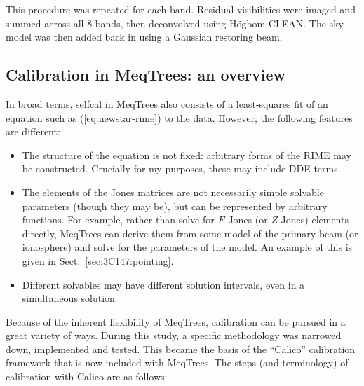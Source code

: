 \documentclass[]{aa}
\begin{document}
This procedure was repeated for each band. Residual visibilities were imaged and summed across all 8 bands, then  deconvolved using H\"ogbom CLEAN. The sky model was then added back in using a Gaussian restoring beam.

\subsection{Calibration in MeqTrees: an overview}

In broad terms, selfcal in MeqTrees also consists of a least-squares fit of an equation such as (\ref{eq:newstar-rime}) to the data. However, the following features are different:

\begin{itemize}
\item The structure of the equation is not fixed: arbitrary forms of the RIME may be constructed. Crucially for my purposes, these may include DDE terms.
\item The elements of the Jones matrices are not necessarily simple solvable parameters (though they may be), but can be represented by arbitrary functions. For example, rather than solve for $E$-Jones (or $Z$-Jones) elements directly, MeqTrees can derive them from some model of the primary beam (or ionosphere) and solve for the parameters of the model. An example of this is given in Sect.~\ref{sec:3C147:pointing}.
\item Different solvables may have different solution intervals, even in a simultaneous solution.
\end{itemize}

Because of the inherent flexibility of MeqTrees, calibration can be pursued in a great variety of ways. During this study, a specific methodology was narrowed down, implemented and tested. This became the basis of the ``Calico'' calibration framework that is now included with MeqTrees. The steps (and terminology) of calibration with Calico are as follows:
\end{document}
